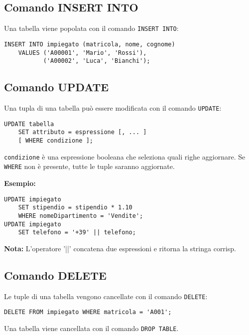 \documentclass[a4paper, 10pt, titlepage]{article}
\begin{document}
	\subsection{Comando INSERT INTO}
		Una tabella viene popolata con il comando \lstinline|INSERT INTO|:
		\begin{lstlisting}
INSERT INTO impiegato (matricola, nome, cognome)
	VALUES ('A00001', 'Mario', 'Rossi'),
	       ('A00002', 'Luca', 'Bianchi');
		\end{lstlisting}
	
	\subsection{Comando UPDATE}
		Una tupla di una tabella può essere modificata con il comando \lstinline|UPDATE|:
		\begin{lstlisting}
UPDATE tabella
	SET attributo = espressione [, ... ]
	[ WHERE condizione ];
		\end{lstlisting}
	\lstinline|condizione| è una espressione booleana che seleziona quali righe
	aggiornare. Se \lstinline|WHERE| non è presente, tutte le tuple saranno aggiornate.
	
	\textbf{Esempio: }
	\begin{lstlisting}
UPDATE impiegato
	SET stipendio = stipendio * 1.10
	WHERE nomeDipartimento = 'Vendite';
UPDATE impiegato
	SET telefono = '+39' || telefono;
	\end{lstlisting}
	\textbf{Nota:} L’operatore '||' concatena due espressioni e ritorna la stringa corrisp.
	
	\subsection{Comando DELETE}
		Le tuple di una tabella vengono cancellate con il comando \lstinline|DELETE|:
		\begin{lstlisting}
DELETE FROM impiegato WHERE matricola = 'A001';
		\end{lstlisting}
		Una tabella viene cancellata con il comando \lstinline|DROP TABLE|.
		
\end{document}
